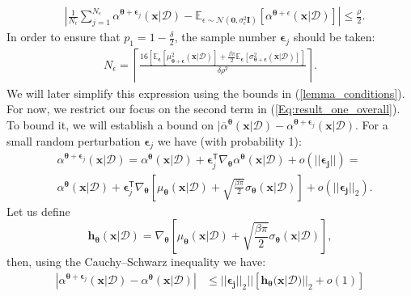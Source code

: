 \documentclass[jair,twoside,11pt,theapa]{article}
\theoremstyle{definition}
\begin{document}
\begin{align}\label{Eq:result_first_bound}
    &\left|\frac{1}{N_{\epsilon}}\sum_{j=1}^{N_{\epsilon}}\alpha^{\bm{\theta}+\bm{\epsilon}_j}(\bm{x}|\mathcal{D}) -  \mathbb{E}_{\epsilon \sim \mathcal{N}(\bm{0}, \sigma_{\epsilon}^{2}\bm{I})}\left[\alpha^{\bm{\theta}+\epsilon}(\bm{x}|\mathcal{D})\right]\right|\le \frac{\rho}{2}.
\end{align}
In order to ensure that $p_1 = 1 -  \frac{\delta}{2}$, the sample number $\bm{\epsilon}_j$ should be taken:
\begin{align*}
    N_{\epsilon} = \left\lceil\frac{16\left[\mathbb{E}_{\bm{\epsilon}}\left[\mu^2_{\bm{\theta} + \bm{\epsilon}}(\bm{x}|\mathcal{D})\right] + \frac{\beta\pi}{2}\mathbb{E}_{\bm{\epsilon}}\left[\sigma^2_{\bm{\theta} + \bm{\epsilon}}(\bm{x}|\mathcal{D})\right]\right]}{\delta\rho^2}\right\rceil.
\end{align*}
We will later simplify this expression using the bounds in (\ref{lemma_conditions}). For now, we restrict our focus on the second term in (\ref{Eq:result_one_overall}). To bound it, we will establish a bound on $|\overline{\alpha}^{\bm{\theta}} (\bm{x}|\mathcal{D}) - \alpha^{\bm{\theta}+\bm{\epsilon}_j}(\bm{x}|\mathcal{D})$. For a small random perturbation $\bm{\epsilon}_j$ we have (with probability 1):
\begin{align*}
    &\alpha^{\bm{\theta}+\bm{\epsilon}_j}(\bm{x}|\mathcal{D}) =  \alpha^{\bm{\theta}}(\bm{x}|\mathcal{D}) + \bm{\epsilon}^{\mathsf{T}}_j\nabla_{\bm{\theta}}\alpha^{\bm{\theta}}(\bm{x}|\mathcal{D}) + o(||\bm{\epsilon_j}||)=\\\nonumber
    &\alpha^{\bm{\theta}}(\bm{x}|\mathcal{D}) + \bm{\epsilon}^{\mathsf{T}}_j\nabla_{\bm{\theta}}\left[\mu_{\bm{\theta}}(\bm{x}|\mathcal{D}) + \sqrt{\frac{\beta\pi}{2}}\sigma_{\bm{\theta}}(\bm{x}|\mathcal{D})\right]+o(||\bm{\epsilon_j}||_2).
\end{align*}
Let us define 
\begin{equation*}
\bm{h}_{ \bm{\theta}}(\bm{x}|\mathcal{D}) = \nabla_{\bm{\theta}}\left[\mu_{\bm{\theta}}(\bm{x}|\mathcal{D}) + \sqrt{\frac{\beta\pi}{2}}\sigma_{\bm{\theta}}(\bm{x}|\mathcal{D})\right],    
\end{equation*}
then, using the Cauchy–Schwarz inequality we have:
\begin{align*}
    \left|\alpha^{\bm{\theta}+\bm{\epsilon}_j}(\bm{x}|\mathcal{D}) - \alpha^{\bm{\theta}}(\bm{x}|\mathcal{D})\right|&\le  ||\bm{\epsilon_j}||_2 ||[\bm{h}_{ \bm{\theta}}(\bm{x}|\mathcal{D})||_2 +o(1)]
\end{align*}
\end{document}
